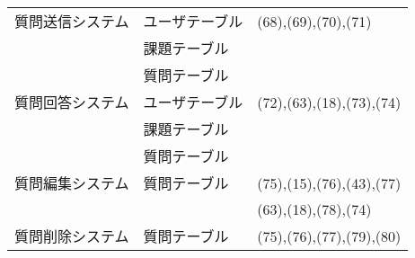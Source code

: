 \begin{table}[h]
\begin{tabular}{|l|l|l|}
    質問送信システム & ユーザテーブル & (68),(69),(70),(71)\\ \cline{2-2}
                  & 課題テーブル & \\ \cline{2-2}
                  & 質問テーブル & \\ \hline
    質問回答システム & ユーザテーブル & (72),(63),(18),(73),(74)\\ \cline{2-2}
                  & 課題テーブル & \\ \cline{2-2}
                  & 質問テーブル & \\ \hline
    質問編集システム & 質問テーブル & (75),(15),(76),(43),(77)\\ \cline{2-2}
                  &            & (63),(18),(78),(74)\\ \hline
    質問削除システム & 質問テーブル & (75),(76),(77),(79),(80)\\ \hline
		\end{tabular}
	\end{table}
